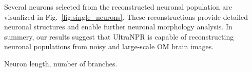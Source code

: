 Several neurons selected from the reconstructed neuronal population are visualized in Fig.~\ref{fig:single_neurons}. These reconstructions provide detailed neuronal structures and enable further neuronal morphology analysis. 
In summery, our results suggest that UltraNPR is capable of reconstructing neuronal populations from noisy and large-scale OM brain images.

Neuron length, number of branches.

